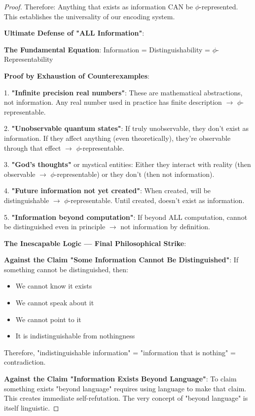\documentclass[12pt,letterpaper]{article}
\begin{document}
\begin{proof}
Therefore: Anything that exists as information CAN be $\phi$-represented. This establishes the universality of our encoding system.

\textbf{Ultimate Defense of "ALL Information"}:

\textbf{The Fundamental Equation}: Information = Distinguishability = $\phi$-Representability

\textbf{Proof by Exhaustion of Counterexamples}:

1. \textbf{"Infinite precision real numbers"}: These are mathematical abstractions, not information. Any real number used in practice has finite description $\to$ $\phi$-representable.

2. \textbf{"Unobservable quantum states"}: If truly unobservable, they don't exist as information. If they affect anything (even theoretically), they're observable through that effect $\to$ $\phi$-representable.

3. \textbf{"God's thoughts"} or mystical entities: Either they interact with reality (then observable $\to$ $\phi$-representable) or they don't (then not information).

4. \textbf{"Future information not yet created"}: When created, will be distinguishable $\to$ $\phi$-representable. Until created, doesn't exist as information.

5. \textbf{"Information beyond computation"}: If beyond ALL computation, cannot be distinguished even in principle $\to$ not information by definition.

\textbf{The Inescapable Logic — Final Philosophical Strike}:

\textbf{Against the Claim "Some Information Cannot Be Distinguished"}:
If something cannot be distinguished, then:
\begin{itemize}
\item We cannot know it exists
\item We cannot speak about it
\item We cannot point to it
\item It is indistinguishable from nothingness
\end{itemize}
Therefore, "indistinguishable information" = "information that is nothing" = contradiction.

\textbf{Against the Claim "Information Exists Beyond Language"}:
To claim something exists "beyond language" requires using language to make that claim. This creates immediate self-refutation. The very concept of "beyond language" is itself linguistic.


\end{proof}
\end{document}
